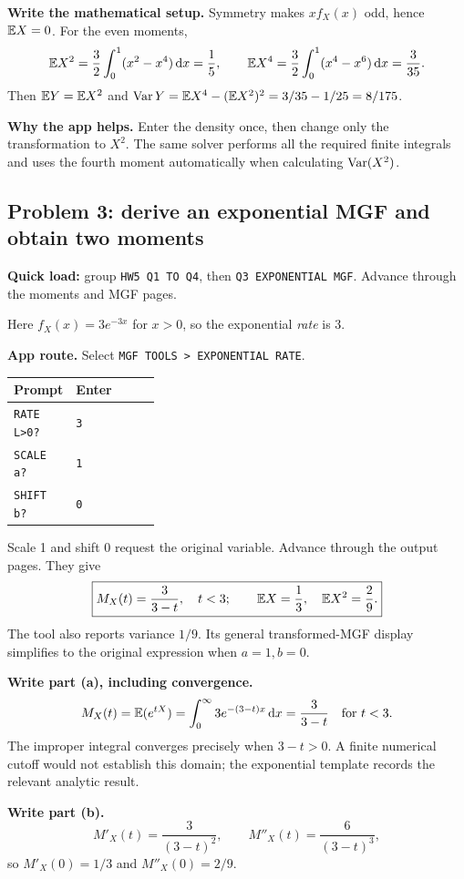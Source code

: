 \textbf{Write the mathematical setup.} Symmetry makes $xf_X(x)$ odd, hence $\mathbb E X=0$. For the even moments,
\[
\mathbb E X^2=\frac32\int_0^1(x^2-x^4)\,\mathrm d x=\frac15,\qquad
\mathbb E X^4=\frac32\int_0^1(x^4-x^6)\,\mathrm d x=\frac3{35}.
\]
Then $\mathbb E Y=\mathbb E X^2$ and $\operatorname{Var} Y=\mathbb E X^4-(\mathbb E X^2)^2=3/35-1/25=8/175$.

\textbf{Why the app helps.} Enter the density once, then change only the transformation to $X^2$. The same solver performs all the required finite integrals and uses the fourth moment automatically when calculating $\operatorname{Var}(X^2)$.

\subsection{Problem 3: derive an exponential MGF and obtain two moments}
\textbf{Quick load:} group \texttt{HW5 Q1 TO Q4}, then \texttt{Q3 EXPONENTIAL MGF}. Advance through the moments and MGF pages.

Here $f_X(x)=3e^{-3x}$ for $x>0$, so the exponential \emph{rate} is 3.

\textbf{App route.} Select \texttt{MGF TOOLS > EXPONENTIAL RATE}.
\begin{center}
\begin{tabularx}{\linewidth}{@{}p{0.32\linewidth}X@{}}
\toprule Prompt & Enter\\\midrule
\texttt{RATE L>0?} & \texttt{3}\\
\texttt{SCALE a?} & \texttt{1}\\
\texttt{SHIFT b?} & \texttt{0}\\\bottomrule
\end{tabularx}
\end{center}
Scale 1 and shift 0 request the original variable. Advance through the output pages. They give
\[
\boxed{M_X(t)=\frac3{3-t},\quad t<3;\qquad \mathbb E X=\frac13,\quad \mathbb E X^2=\frac29.}
\]
The tool also reports variance $1/9$. Its general transformed-MGF display simplifies to the original expression when $a=1,b=0$.

\textbf{Write part (a), including convergence.}
\[
M_X(t)=\mathbb E(e^{tX})=\int_0^\infty 3e^{-(3-t)x}\,\mathrm d x
=\frac3{3-t}\quad\text{for }t<3.
\]
The improper integral converges precisely when $3-t>0$. A finite numerical cutoff would not establish this domain; the exponential template records the relevant analytic result.

\textbf{Write part (b).}
\[
M'_X(t)=\frac3{(3-t)^2},\qquad M''_X(t)=\frac6{(3-t)^3},
\]
so $M'_X(0)=1/3$ and $M''_X(0)=2/9$.

